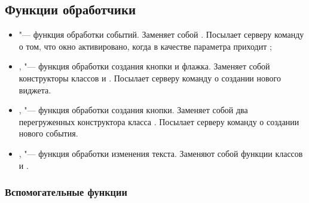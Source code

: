 \subsection{Функции обработчики}

\begin{itemize}
	\item {} "--- функция обработки событий. Заменяет собой 
	. Посылает серверу команду о том, что окно
	активировано, когда в качестве параметра приходит
	;
	\item {},  "--- функция обработки
	создания кнопки и флажка. Заменяет собой конструкторы классов  и . Посылает серверу команду о
	создании нового виджета.
	\item {},  "--- функция
	обработки создания кнопки. Заменяет собой два перегруженных конструктора
	класса . Посылает серверу команду о создании нового события.
	\item {},  "--- функция обработки
	изменения текста. Заменяют собой функции  классов
	 и .
\end{itemize}

\subsubsection{Вспомогательные функции}

